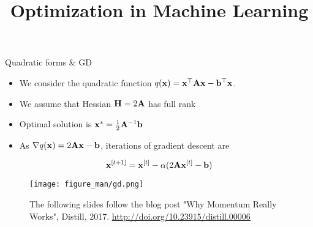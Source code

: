 \documentclass[11pt,compress,t,notes=noshow, xcolor=table]{beamer}
\title{Optimization in Machine Learning}
\begin{document}


\begin{vbframe}{Quadratic forms \& GD}

\begin{itemize}
	\item We consider the quadratic function $q(\mathbf{x}) = \mathbf{x}^\top \mathbf{A} \mathbf{x} - \mathbf{b}^\top \mathbf{x}$. 
	\item We assume that Hessian $\mathbf{H} = 2 \mathbf{A}$ has full rank
	\item Optimal solution is $\mathbf{x}^\ast = \frac{1}{2} \mathbf{A}^{-1} \mathbf{b}$ 
	\item As $\nabla q(\mathbf{x}) = 2 \mathbf{A} \mathbf{x} - \mathbf{b}$, iterations of gradient descent are
\end{itemize}

\vspace{-0.5\baselineskip}

\begin{equation*}
    \mathbf{x}^{[t+1]} = \mathbf{x}^{[t]} - \alpha (2 \mathbf{A} \mathbf{x}^{[t]} - \mathbf{b})
\end{equation*}

\vspace{-\baselineskip}

\begin{figure}
	\texttt{[image: figure\_man/gd.png]}
    \caption*{\centering \footnotesize
        The following slides follow the blog post "Why Momentum Really Works", Distill, 2017.
        \url{http://doi.org/10.23915/distill.00006}}
\end{figure}

\end{vbframe}
\end{document}
